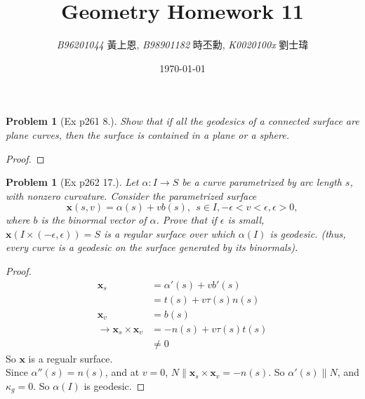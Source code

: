 \documentclass[10pt,a4paper]{article}
\newcommand{\LiHei}{\CJKfamily{lh}}
\newcounter{theProblemCounter}
\newtheorem{problem}[theProblemCounter]{Problem}
\begin{document}
\title{{Geometry Homework 11}}
\author{{\it{B96201044}} {\LiHei 黃上恩}, {\it{B98901182}} {\LiHei 時丕勳}, {\it{K0020100x}} {\LiHei 劉士瑋}}
\date{\today}
\maketitle

\newcommand{\bx}{\mathbb{X}}
\newcommand{\bfx}{\mathbf{x}}
\newcommand{\grad}{\textrm{grad }}
\newcommand{\sech}{\mbox{sech}}

\setcounter{theProblemCounter}{3}
\begin{problem}[Ex p261 8.]
Show that if all the geodesics of a connected surface are plane curves, then the surface is contained in a plane or a sphere.
\end{problem}
\begin{proof}

\end{proof}

\setcounter{theProblemCounter}{4}
\begin{problem}[Ex p262 17.]
Let $\alpha: I\to S$ be a curve parametrized by arc length $s$, with nonzero curvature. Consider the parametrized surface
\[ \bfx(s, v) = \alpha(s)+vb(s), \ \ s\in I, -\epsilon<v<\epsilon, \epsilon > 0,\]
where $b$ is the binormal vector of $\alpha$. Prove that if $\epsilon$ is small, $\bfx(I\times (-\epsilon, \epsilon)) = S$ is a regular surface over which $\alpha(I)$ is geodesic. (thus, every curve is a geodesic on the surface generated by its binormals).
\end{problem}
\begin{proof}
\begin{align*}
\bfx_s&=\alpha'(s)+vb'(s)\\
&=t(s)+v\tau(s)n(s)\\
\bfx_v&=b(s)\\
\rightarrow \bfx_s\times\bfx_v&=-n(s)+v\tau(s)t(s)\\
&\neq 0
\end{align*}
So $\bfx$ is a regualr surface.\\
Since $\alpha''(s)=n(s)$, and at $v=0$, $N\parallel \bfx_s\times\bfx_v=-n(s)$. So $\alpha'(s)\parallel N$, and $\kappa_g=0$. So $\alpha(I)$ is geodesic.
\end{proof}
\end{document}
